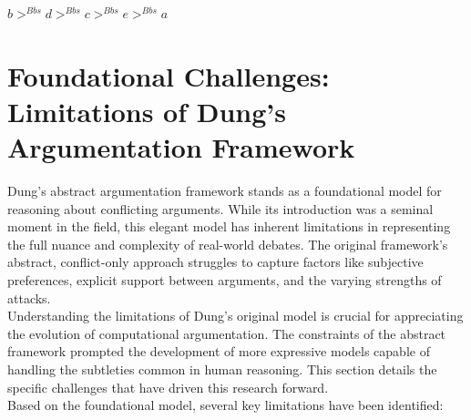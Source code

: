 \documentclass{scrbook}
\begin{document}
$b >^{Bbs} d >^{Bbs} c >^{Bbs} e >^{Bbs} a$

\chapter{Foundational Challenges: Limitations of Dung’s Argumentation Framework}

Dung's abstract argumentation framework stands as a foundational model for reasoning about conflicting arguments. While its introduction was a seminal moment in the field, this elegant model has inherent limitations in representing the full nuance and complexity of real-world debates. The original framework's abstract, conflict-only approach struggles to capture factors like subjective preferences, explicit support between arguments, and the varying strengths of attacks. \\

Understanding the limitations of Dung's original model is crucial for appreciating the evolution of computational argumentation. The constraints of the abstract framework prompted the development of more expressive models capable of handling the subtleties common in human reasoning. This section details the specific challenges that have driven this research forward. \\

Based on the foundational model, several key limitations have been identified:
\end{document}
